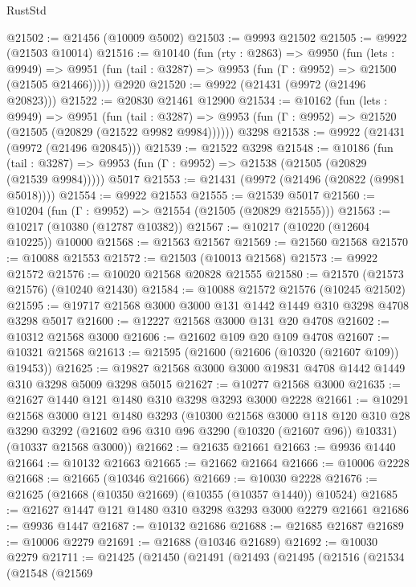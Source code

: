 \begin{lexlean}{RustStd}
\begin{coremodule}
@21502 := @21456 (@10009 @5002)
@21503 := @9993 @21502
@21505 := @9922 (@21503 @10014)
@21516 := @10140
    (fun (rty : @2863) =>
    @9950
      (fun (lets : @9949) =>
      @9951 (fun (tail : @3287) => @9953 (fun (Γ : @9952) => @21500 (@21505 @21466)))))
    @2920
@21520 := @9922 (@21431 (@9972 (@21496 @20823)))
@21522 := @20830 @21461 @12900
@21534 := @10162
    (fun (lets : @9949) =>
    @9951
      (fun (tail : @3287) =>
      @9953 (fun (Γ : @9952) => @21520 (@21505 (@20829 (@21522 @9982 @9984))))))
    @3298
@21538 := @9922 (@21431 (@9972 (@21496 @20845)))
@21539 := @21522 @3298
@21548 := @10186
    (fun (tail : @3287) => @9953 (fun (Γ : @9952) => @21538 (@21505 (@20829 (@21539 @9984)))))
    @5017
@21553 := @21431 (@9972 (@21496 (@20822 (@9981 @5018))))
@21554 := @9922 @21553
@21555 := @21539 @5017
@21560 := @10204 (fun (Γ : @9952) => @21554 (@21505 (@20829 @21555)))
@21563 := @10217 (@10380 (@12787 @10382))
@21567 := @10217 (@10220 (@12604 @10225)) @10000
@21568 := @21563 @21567
@21569 := @21560 @21568
@21570 := @10088 @21553
@21572 := @21503 (@10013 @21568)
@21573 := @9922 @21572
@21576 := @10020 @21568 @20828 @21555
@21580 := @21570 (@21573 @21576) (@10240 @21430)
@21584 := @10088 @21572 @21576 (@10245 @21502)
@21595 := @19717 @21568 @3000 @3000 @131 @1442 @1449 @310 @3298 @4708 @3298 @5017
@21600 := @12227 @21568 @3000 @131 @20 @4708
@21602 := @10312 @21568 @3000
@21606 := @21602 @109 @20 @109 @4708
@21607 := @10321 @21568
@21613 := @21595 (@21600 (@21606 (@10320 (@21607 @109)) @19453))
@21625 := @19827 @21568 @3000 @3000 @19831 @4708 @1442 @1449 @310 @3298 @5009 @3298 @5015
@21627 := @10277 @21568 @3000
@21635 := @21627 @1440 @121 @1480 @310 @3298 @3293 @3000 @2228
@21661 := @10291
    @21568
    @3000
    @121
    @1480
    @3293
    (@10300
      @21568
      @3000
      @118
      @120
      @310
      @28
      @3290
      @3292
      (@21602 @96 @310 @96 @3290 (@10320 (@21607 @96)) @10331)
      (@10337 @21568 @3000))
@21662 := @21635 @21661
@21663 := @9936 @1440
@21664 := @10132 @21663
@21665 := @21662 @21664
@21666 := @10006 @2228
@21668 := @21665 (@10346 @21666)
@21669 := @10030 @2228
@21676 := @21625 (@21668 (@10350 @21669) (@10355 (@10357 @1440)) @10524)
@21685 := @21627 @1447 @121 @1480 @310 @3298 @3293 @3000 @2279 @21661
@21686 := @9936 @1447
@21687 := @10132 @21686
@21688 := @21685 @21687
@21689 := @10006 @2279
@21691 := @21688 (@10346 @21689)
@21692 := @10030 @2279
@21711 := @21425
    (@21450
      (@21491
        (@21493
          (@21495
            (@21516
              (@21534
                (@21548
                  (@21569

\end{coremodule}
\end{lexlean}
